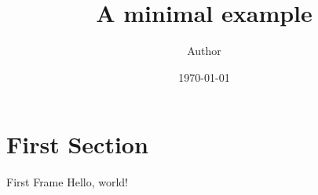 \documentclass[xetex, unicode, 10pt]{beamer}
\title{A minimal example}
\date{\today}
\author{Author}
\institute{Institute}
\begin{document}
  \maketitle
  \section{First Section}
  \begin{frame}{First Frame}
    Hello, world!
  \end{frame}
\end{document}
